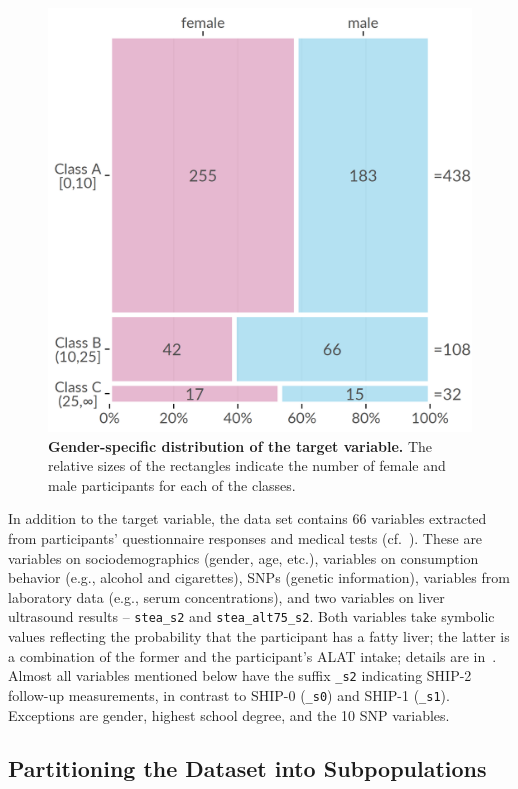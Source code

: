 \documentclass[
  oneside]{book}
\begin{document}
\begin{figure}[htbp]

{\centering \includegraphics[width=0.5\linewidth]{figures/03-fatty-liver-mosaic} 

}

\caption{\textbf{Gender-specific distribution of the target variable.} The relative sizes of the rectangles indicate the number of female and male participants for each of the classes.}\label{fig:03-fatty-liver-mosaic}
\end{figure}

In addition to the target variable, the data set contains 66 variables extracted from participants' questionnaire responses and medical tests (cf.~\autocite{Voelzke:SHIP2011}).
These are variables on sociodemographics (gender, age, etc.),
variables on consumption behavior (e.g., alcohol and cigarettes), SNPs (genetic information), variables from laboratory data (e.g., serum concentrations), and two variables on liver ultrasound results -- \texttt{stea\_s2} and \texttt{stea\_alt75\_s2}.
Both variables take symbolic values reflecting the probability that the participant has a fatty liver; the latter is a combination of the former and the participant's ALAT intake; details are in~\autocite{Voelzke:SHIP2011}.
Almost all variables mentioned below have the suffix \texttt{\_s2} indicating SHIP-2 follow-up measurements, in contrast to SHIP-0 (\texttt{\_s0}) and SHIP-1 (\texttt{\_s1}).
Exceptions are gender, highest school degree, and the 10 SNP variables.

\hypertarget{imm-workflow-partitioning}{%
\subsection{Partitioning the Dataset into Subpopulations}\label{imm-workflow-partitioning}}
\end{document}
